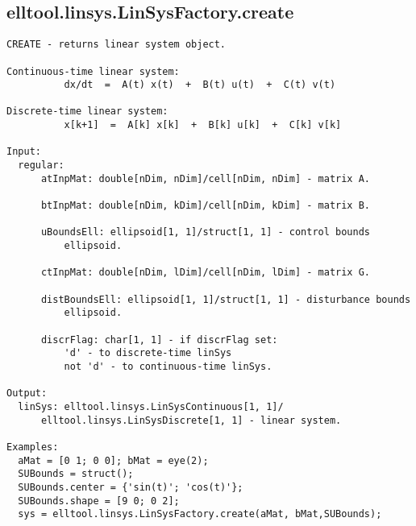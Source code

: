 \subsection{\texorpdfstring{elltool.linsys.LinSysFactory.create}{create}}\label{method:elltool.linsys.LinSysFactory.create}
\begin{verbatim}
CREATE - returns linear system object.

Continuous-time linear system:
          dx/dt  =  A(t) x(t)  +  B(t) u(t)  +  C(t) v(t)

Discrete-time linear system:
          x[k+1]  =  A[k] x[k]  +  B[k] u[k]  +  C[k] v[k]

Input:
  regular:
      atInpMat: double[nDim, nDim]/cell[nDim, nDim] - matrix A.

      btInpMat: double[nDim, kDim]/cell[nDim, kDim] - matrix B.

      uBoundsEll: ellipsoid[1, 1]/struct[1, 1] - control bounds
          ellipsoid.

      ctInpMat: double[nDim, lDim]/cell[nDim, lDim] - matrix G.

      distBoundsEll: ellipsoid[1, 1]/struct[1, 1] - disturbance bounds
          ellipsoid.

      discrFlag: char[1, 1] - if discrFlag set:
          'd' - to discrete-time linSys
          not 'd' - to continuous-time linSys.

Output:
  linSys: elltool.linsys.LinSysContinuous[1, 1]/
      elltool.linsys.LinSysDiscrete[1, 1] - linear system.

Examples:
  aMat = [0 1; 0 0]; bMat = eye(2);
  SUBounds = struct();
  SUBounds.center = {'sin(t)'; 'cos(t)'};
  SUBounds.shape = [9 0; 0 2];
  sys = elltool.linsys.LinSysFactory.create(aMat, bMat,SUBounds);
\end{verbatim}
